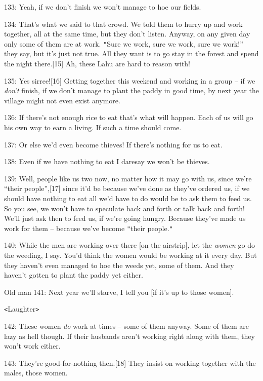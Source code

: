 {133: Yeah, if we don't finish we won't manage to hoe our fields. }

{134: That's what we said to that crowd. We told them to hurry up and work
together, all at the same time, but they don't listen. Anyway, on any given day
only some of them are at work. \texttt{"}Sure we work, sure we work, sure we work!''
they say, but it's just not true. All they want is to go stay in the forest and
spend the night there.[15] Ah, these Lahu are hard to reason with! }

{135: Yes sirree![16] Getting together this weekend and working in a group
-- if we}{\textit{ don't}}{ finish, if we don't manage to plant the
paddy in good time, by next year the village might not even exist anymore.  }

{136: If there's not enough rice to eat that's what will happen. Each of
us will go his own way to earn a living. If such a time should come.}

{137: Or else we'd even become thieves! If there's nothing for us to eat.
}

{138: Even if we have nothing to eat I daresay we won't be thieves. }

{139: Well, people like us two now, no matter how it may go with us, since
we're ``their people'',[17] since it'd be because we've done as they've ordered
us, if we should have nothing to eat all we'd have to do would be to ask them to
feed us. So you see, we won't have to speculate back and forth or talk back and
forth! We'll just ask then to feed us, if we're going hungry. Because they've made
us work for them -- because we've become \texttt{"}their people.\texttt{"}}

{140: While the men are working over there [on the airstrip], let the }{\textit{women
}}{go do the weeding, I say. You'd think the women would be working at it
every day. But they haven't even managed to hoe the weeds yet, some of them. And
they haven't gotten to plant the paddy yet either. }

{Old man 141: Next year we'll starve, I tell you [if it's up to those women].}

{\texttt{<}Laughter\texttt{>}}

{142: These women }{\textit{do}}{ work at times -- some of
them anyway. Some of them are lazy as hell though. If their husbands aren't working
right along with them, they won't work either. }

{143: They're good-for-nothing then.[18] They insist on working together
with the males, those women. }

